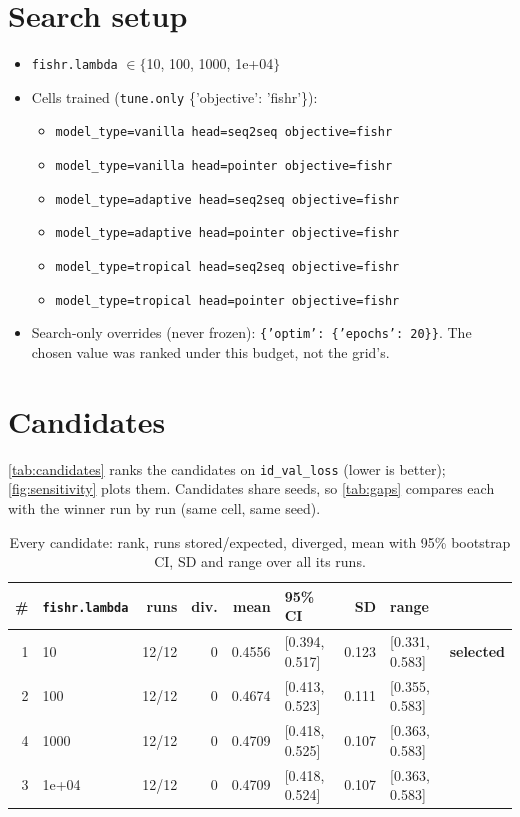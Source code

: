 \documentclass[10pt]{article}
\begin{document}
\section{Search setup}
\begin{itemize}\setlength\itemsep{0pt}
\item \texttt{fishr.lambda} $\in \{$10, 100, 1000, 1e+04$\}$
\item Cells trained (\texttt{tune.only} \{'objective': 'fishr'\}):
\begin{itemize}\setlength\itemsep{0pt}
\item \texttt{model\_type=vanilla head=seq2seq objective=fishr}
\item \texttt{model\_type=vanilla head=pointer objective=fishr}
\item \texttt{model\_type=adaptive head=seq2seq objective=fishr}
\item \texttt{model\_type=adaptive head=pointer objective=fishr}
\item \texttt{model\_type=tropical head=seq2seq objective=fishr}
\item \texttt{model\_type=tropical head=pointer objective=fishr}
\end{itemize}
\item Search-only overrides (never frozen): \texttt{\{'optim': \{'epochs': 20\}\}}. The chosen value was ranked under this budget, not the grid's.
\end{itemize}

\section{Candidates}
\autoref{tab:candidates} ranks the candidates on \texttt{id\_val\_loss} (lower is better); \autoref{fig:sensitivity} plots them.
Candidates share seeds, so \autoref{tab:gaps} compares each with the winner run by run (same cell, same seed).

{\small
\begin{longtable}{rlrrrlrll}
\caption{Every candidate: rank, runs stored/expected, diverged, mean with 95\% bootstrap CI, SD and range over all its runs.}\label{tab:candidates}\\
\toprule
\# & \texttt{fishr.lambda} & runs & div. & mean & 95\% CI & SD & range & \\
\midrule
\endhead
1 & 10 & 12/12 & 0 & 0.4556 & [0.394, 0.517] & 0.123 & [0.331, 0.583] & \textbf{selected}\\
2 & 100 & 12/12 & 0 & 0.4674 & [0.413, 0.523] & 0.111 & [0.355, 0.583] & \\
4 & 1000 & 12/12 & 0 & 0.4709 & [0.418, 0.525] & 0.107 & [0.363, 0.583] & \\
3 & 1e+04 & 12/12 & 0 & 0.4709 & [0.418, 0.524] & 0.107 & [0.363, 0.583] & \\
\bottomrule
\end{longtable}
}
\end{document}
